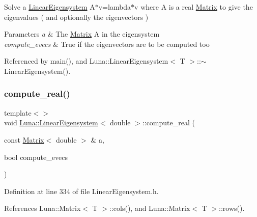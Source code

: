 Solve a \hyperlink{classLuna_1_1LinearEigensystem}{Linear\+Eigensystem} A$\ast$v=lambda$\ast$v where A is a real \hyperlink{classLuna_1_1Matrix}{Matrix} to give the eigenvalues ( and optionally the eigenvectors ) 


\begin{DoxyParams}{Parameters}
{\em a} & The \hyperlink{classLuna_1_1Matrix}{Matrix} A in the eigensystem \\
\hline
{\em compute\+\_\+evecs} & True if the eigenvectors are to be computed too \\
\hline
\end{DoxyParams}


Referenced by main(), and Luna\+::\+Linear\+Eigensystem$<$ T $>$\+::$\sim$\+Linear\+Eigensystem().

\mbox{\label{classLuna_1_1LinearEigensystem_a0aa01a39e1b44cc2cf225c8566d6bd95}} 
\subsubsection{\texorpdfstring{compute\+\_\+real()}{compute\_real()}\hspace{0.1cm}{\footnotesize\ttfamily [2/2]}}
{\footnotesize\ttfamily template$<$$>$ \\
void \hyperlink{classLuna_1_1LinearEigensystem}{Luna\+::\+Linear\+Eigensystem}$<$ double $>$\+::compute\+\_\+real (\begin{DoxyParamCaption}\item[{const \hyperlink{classLuna_1_1Matrix}{Matrix}$<$ double $>$ \&}]{a,  }\item[{bool}]{compute\+\_\+evecs }\end{DoxyParamCaption})\hspace{0.3cm}{\ttfamily [inline]}}



Definition at line 334 of file Linear\+Eigensystem.\+h.



References Luna\+::\+Matrix$<$ T $>$\+::cols(), and Luna\+::\+Matrix$<$ T $>$\+::rows().


